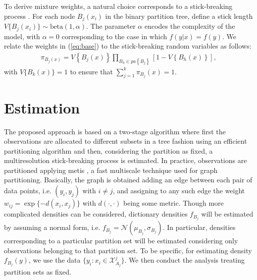 \documentclass{article}
\providecommand{\mc}[1]{\mathcal{#1}}
\begin{document}
To derive mixture weights, a natural choice corresponds to a stick-breaking process \cite{stickbreaking}.  For each node $B_j(x_i)$ in the binary partition tree, define a stick length $V\{B_j(x_i)\} \sim \mbox{beta}(1,\alpha)$.  The parameter $\alpha$ encodes the complexity of the model, with $\alpha=0$ corresponding to the case in which $f(y|x) = f(y)$.  We relate the weights in (\ref{eq:base}) to the stick-breaking random variables as follows: 
\begin{eqnarray*}
\pi_{B_j(x)} = V\left\{B_j(x)\right\} \prod_{B_h \in pa\left\{B_j\right\}} \left[1 - V\left\{B_h(x)\right\}\right],
\end{eqnarray*}
with $V\{B_k(x)\}=1$ to ensure that $\sum_{j=1}^k \pi_{B_j}(x) = 1$.    
\vskip 12pt


\section{Estimation}

The proposed approach is based on a two-stage algorithm where first the observations are allocated to different subsets in a tree fashion using an efficient partitioning algorithm and then, considering the partition as fixed, a multiresolution stick-breaking process is estimated. In practice, observations are partitioned applying metis \cite{metis}, a fast multiscale technique used for graph partitioning. Basically, the graph is obtained adding an edge between each pair of data points, i.e. $(y_i,y_j)$ with $i\not=j$, and assigning to any such edge the weight $w_{ij}=\exp\{-d(x_i,x_j)\}$ with $d(\cdot,\cdot)$ being some metric. Though more complicated densities can be considered, dictionary densities $f_{B_j}$ will be estimated by assuming a normal form, i.e. $f_{B_j}=\mc{N}(\mu_{B_j},\sigma_{B_j})$. In particular, densities corresponding to a particular partition set will be estimated considering only observations belonging to that partition set. To be specific, for estimating density $f_{B_j}(y)$, we use the data $\{ y_i: x_i \in \mathcal{X}^j_{A_j} \}$. We then conduct the analysis treating partition sets as fixed. 
\end{document}
